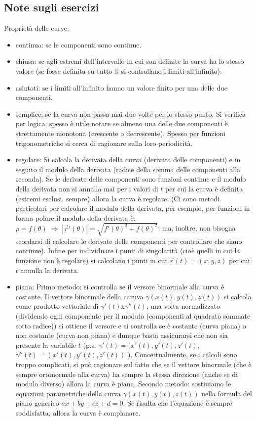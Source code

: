 \subsection{Note sugli esercizi}
\begin{tcolorbox}
Proprietà delle curve:
\begin{itemize}
    \item continua: se le componenti sono continue.
    \item chiusa: se agli estremi dell'intervallo in cui son definite la curva ha lo stesso valore (se fosse definita su tutto $\mathbb{R}$ si controllano i limiti all'infinito).
    \item asintoti: se i limiti all'infinito hanno un valore finito per una delle due componenti.
    \item semplice: se la curva non passa mai due volte per lo stesso punto. Si verifica per logica, spesso è utile notare se almeno una delle due componenti è strettamente monotona (crescente o decrescente). Spesso per funzioni trigonometriche si cerca di ragionare sulla loro periodicità.
    \item regolare: Si calcola la derivata della curva (derivata delle componenti) e in seguito il modulo della derivata (radice della somma delle componenti alla seconda). Se le derivate delle componenti sono funzioni continue e il modulo della derivata non si annulla mai per i valori di $t$ per cui la curva è definita (estremi esclusi, sempre) allora la curva è regolare. (Ci sono metodi particolari per calcolare il modulo della derivata, per esempio, per funzioni in forma polare il modulo della derivata è: $\rho = f(\theta) \; \Rightarrow \; |\vec{r}'(\theta)| = \sqrt{f'(\theta)^2 + f(\theta)^2}$; ma, inoltre, non bisogna scordarsi di calcolare le derivate delle componenti per controllare che siano continue).\newline
    Infine per individuare i punti di singolarità (cioè quelli in cui la funzione non è regolare) si calcolano i punti in cui $\vec{r}(t) = (x,y,z)$ per cui $t$ annulla la derivata.
    \item piana: \newline
    Primo metodo: si controlla se il versore binormale alla curva è costante. Il vettore binormale della caruva $\gamma(x(t), y(t), z(t))$ si calcola come prodotto vettoriale di $\gamma'(t) \text{x} \gamma''(t)$, una volta normalizzato (dividendo ogni componente per il modulo (componenti al quadrato sommate sotto radice)) si ottiene il versore e si controlla se è costante (curva piana) o non costante (curva non piana) e dunque basta assicurarsi che non sia presente la variabile $t$ (p.s. $\gamma'(t) = (x'(t), y'(t), z'(t)$, $\gamma''(t) = (x'(t), y'(t), z'(t))$ ). Concettualmente, se i calcoli sono troppo complicati, si può ragionare sul fatto che se il vettore binormale (che è sempre ortonormale alla curva) ha sempre la stessa direzione (anche se di modulo diverso) allora la curva è piana.\newline
    Secondo metodo: sostiuiamo le equazioni parametriche della curva $\gamma(x(t), y(t), z(t))$ nella formula del piano generico $ax + by +cz + d = 0$. Se risulta che l'equazione è sempre soddisfatta, allora la curva è complanare.
\end{itemize}
\end{tcolorbox}
